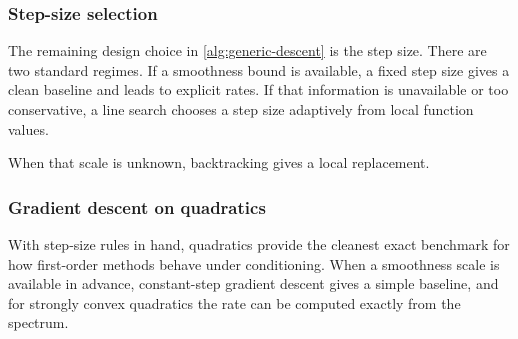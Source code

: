 \subsubsection{Step-size selection}
\label{subsec:line-search}

The remaining design choice in \cref{alg:generic-descent} is the step size.
There are two standard regimes.
If a smoothness bound is available, a fixed step size gives a clean baseline and leads to explicit rates.
If that information is unavailable or too conservative, a line search chooses a step size adaptively from local function values.



When that scale is unknown, backtracking gives a local replacement.


\subsubsection{Gradient descent on quadratics}

With step-size rules in hand, quadratics provide the cleanest exact benchmark for how first-order methods behave under conditioning.
When a smoothness scale is available in advance, constant-step gradient descent gives a simple baseline, and for strongly convex quadratics the rate can be computed exactly from the spectrum.

